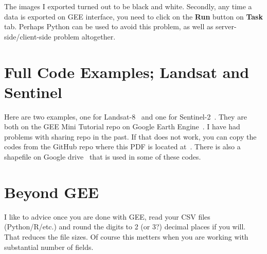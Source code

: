 \documentclass{article}
\begin{document}
\begin{description}
The images I exported turned out to be black and white.
Secondly, any time a data is exported on GEE interface, you need
to click on the \textbf{Run} button on \textbf{Task} tab. Perhaps Python
can be used to avoid this problem, as well as server-side/client-side
problem altogether.

\end{description}


\section{Full Code Examples; Landsat and Sentinel}

Here are two examples, one for Landsat-8~\cite{FullCodeLandsat8} 
and one for Sentinel-2~\cite{FullCodeSentinel}.
They are both on the GEE Mini Tutorial repo on 
Google Earth Engine~\cite{GEEMiniTutorialRepoonEE}. 
I have had problems with sharing repo in the past.
If that does not work, you can copy the codes
from the GitHub repo where this PDF is located
at~\cite{MiniTutorialOnGitHub}.
There is also a shapefile on Google drive~\cite{ShapeFileOnDrive} that is used
in some of these codes.


\section{Beyond GEE}
I like to advice once you are done with GEE,
read your CSV files (Python/R/etc.) and round the 
digits to 2 (or 3?) decimal places
if you will. That reduces the file sizes.
Of course this metters when you are working
with substantial number of fields.





\end{document}
